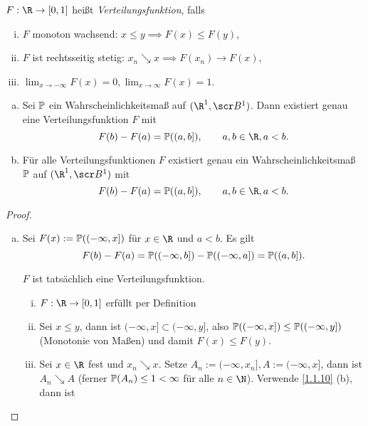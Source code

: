 \begin{df} \label{1.4.1}
	$F: \R \to [0,1]$ heißt \emph{Verteilungsfunktion}, falls
	\begin{enumerate}[(i)]
		\item
			$F$ monoton wachsend: $x \le y \implies F(x) \le F(y)$,
		\item
			$F$ ist rechtsseitig stetig: $x_n \searrow x \implies F(x_n) \to F(x)$,
		\item
			$\lim_{x\to -\infty} F(x) = 0, \lim_{x\to \infty} F(x) = 1$.
	\end{enumerate}
\end{df}

\begin{st} \label{1.4.2}
	\begin{enumerate}[(a)]
		\item
			Sei $\P$ ein Wahrscheinlichkeitsmaß auf $(\R^1, \scr B^1)$.
			Dann existiert genau eine Verteilungsfunktion $F$ mit
			\[
				F(b) - F(a)
				= \P((a,b]),
				\qquad
				a,b\in\R, a<b.
			\]
		\item
			Für alle Verteilungsfunktionen $F$ existiert genau ein Wahrscheinlichkeitsmaß $\P$ auf $(\R^1, \scr B^1)$ mit
			\[
				F(b) - F(a)
				= \P((a,b]),
				\qquad
				a,b\in\R, a<b.
			\]
	\end{enumerate}
	\begin{proof}
		\begin{enumerate}[(a)]
			\item
				\begin{seg}[Existenz]
					Sei $F(x) := \P((-\infty,x])$ für $x \in \R$ und $a < b$.
					Es gilt
					\[
						F(b) - F(a)
						= \P((-\infty,b]) - \P((-\infty,a])
						= \P((a,b]).
					\]
				\end{seg}
				\begin{seg}[Verteilungsfunktion]
					$F$ ist tatsächlich eine Verteilungsfunktion.
					\begin{enumerate}[(i)] %
						\item
							$F : \R \to [0,1]$ erfüllt per Definition
						\item
							Sei $x \le y$, dann ist $(-\infty, x] \subset (-\infty, y]$, also $\P((-\infty, x]) \le \P((-\infty, y])$ (Monotonie von Maßen) und damit $F(x) \le F(y)$.
						\item
							Sei $x \in \R$ fest und $x_n \searrow x$.
							Setze $A_n := (-\infty, x_n], A := (-\infty, x]$, dann ist $A_n \searrow A$ (ferner $\P(A_n) \le 1 < \infty$ für alle $n\in \N$).
							Verwende \ref{1.1.10} (b), dann ist

\end{enumerate}
\end{seg}
\end{enumerate}
\end{proof}
\end{st}
